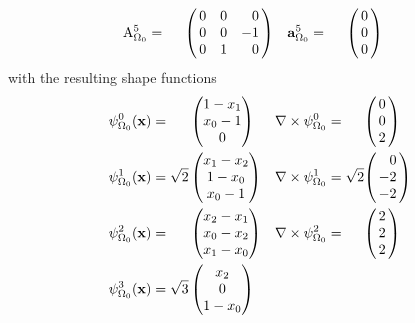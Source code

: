 \documentclass{scrartcl}
\newenvironment{Matrix}[1]{\left(\mspace{-6mu}\begin{array}{*{#1}{r}}}{\end{array}\mspace{-6mu}\right)}
\newenvironment{Matrix3}{\begin{Matrix}3}{\end{Matrix}}
\newenvironment{Vector}{\begin{Matrix}1}{\end{Matrix}}
\newcommand\psqrt{\phantom{\sqrt0}}
\begin{document}
\begin{align}
\\
  \mathrm A_{\Omega_0}^5&=\psqrt\begin{Matrix3}
     0 &  0 &  0 \\
     0 &  0 & -1 \\
     0 &  1 &  0
  \end{Matrix3} & 
  \mathbf a_{\Omega_0}^5&=\psqrt\begin{Vector}  0 \\  0 \\  0 \end{Vector}
\end{align}
with the resulting shape functions
\begin{align}
  \psi_{\Omega_0}^0(\mathbf x)
    &=\psqrt\begin{pmatrix} 1-x_1 \\ x_0-1 \\ 0 \end{pmatrix} &
  \nabla\times\psi_{\Omega_0}^0
    &=\psqrt\begin{Vector}  0 \\  0 \\  2 \end{Vector}
\\
  \psi_{\Omega_0}^1(\mathbf x)
    &=\sqrt2\begin{pmatrix} x_1-x_2 \\ 1-x_0 \\ x_0-1 \end{pmatrix} &
  \nabla\times\psi_{\Omega_0}^1
    &=\sqrt2\begin{Vector}  0 \\ -2 \\ -2 \end{Vector}
\\
  \psi_{\Omega_0}^2(\mathbf x)
    &=\psqrt\begin{pmatrix} x_2-x_1 \\ x_0-x_2 \\ x_1-x_0 \end{pmatrix} &
  \nabla\times\psi_{\Omega_0}^2
    &=\psqrt\begin{Vector}  2 \\  2 \\  2 \end{Vector}
\\
  \psi_{\Omega_0}^3(\mathbf x)
    &=\sqrt3\begin{pmatrix} x_2 \\ 0 \\ 1-x_0 \end{pmatrix} &

\end{align}
\end{document}
